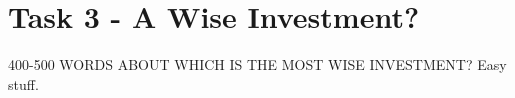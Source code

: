 \documentclass[11pt]{article}
\begin{document}
\section*{Task 3 - A Wise Investment?}


400-500 WORDS ABOUT WHICH IS THE MOST WISE INVESTMENT? Easy stuff.
\end{document}
